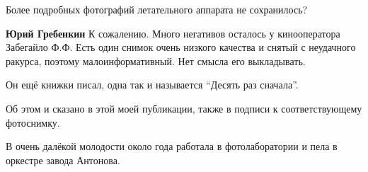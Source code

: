 \begin{itemize}
Более подробных фотографий летательного аппарата не сохранилось?

\begin{itemize} %
\textbf{Юрий Гребенкин} К сожалению. Много негативов осталось у кинооператора Забегайло Ф.Ф. Есть один снимок очень низкого качества и снятый с неудачного ракурса, поэтому малоинформативный. Нет смысла его выкладывать.
\end{itemize} %

Он ещё книжки писал, одна так и называется \enquote{Десять раз сначала}.

\begin{itemize} %

Об этом и сказано в этой моей публикации, также в подписи к соответствующему
фотоснимку.
\end{itemize} %


В очень далёкой молодости около года работала в фотолаборатории и пела в
оркестре завода Антонова.

\end{itemize} %
